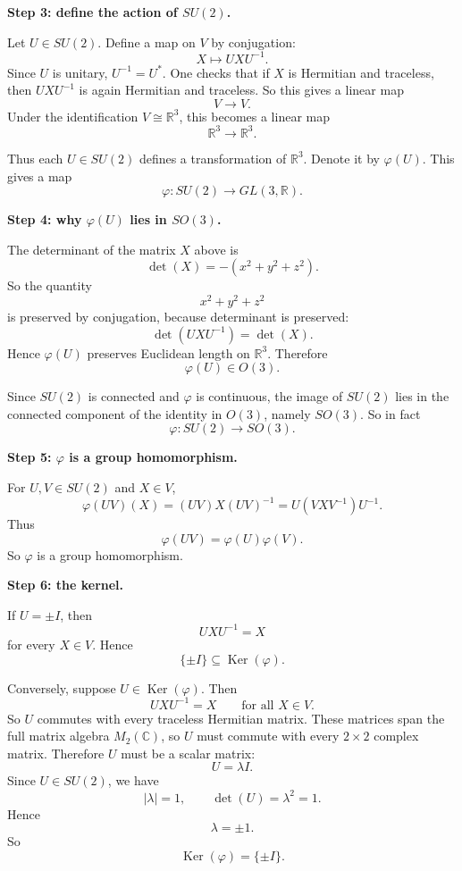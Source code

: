 \documentclass[12pt,a4paper]{article}
\theoremstyle{notespace}
\DeclareMathOperator{\Ker}{Ker}
\begin{document}
\medskip

\textbf{Step 3: define the action of \(SU(2)\).}

Let \(U\in SU(2)\). Define a map on \(V\) by conjugation:
\[
X\longmapsto UXU^{-1}.
\]
Since \(U\) is unitary, \(U^{-1}=U^*\). One checks that if \(X\) is Hermitian and traceless, then \(UXU^{-1}\) is again Hermitian and traceless. So this gives a linear map
\[
V\to V.
\]
Under the identification \(V\cong \mathbb R^3\), this becomes a linear map
\[
\mathbb R^3\to \mathbb R^3.
\]

Thus each \(U\in SU(2)\) defines a transformation of \(\mathbb R^3\). Denote it by \(\varphi(U)\). This gives a map
\[
\varphi:SU(2)\to GL(3,\mathbb R).
\]

\medskip

\textbf{Step 4: why \(\varphi(U)\) lies in \(SO(3)\).}

The determinant of the matrix \(X\) above is
\[
\det(X)=-(x^2+y^2+z^2).
\]
So the quantity
\[
x^2+y^2+z^2
\]
is preserved by conjugation, because determinant is preserved:
\[
\det(UXU^{-1})=\det(X).
\]
Hence \(\varphi(U)\) preserves Euclidean length on \(\mathbb R^3\). Therefore
\[
\varphi(U)\in O(3).
\]

Since \(SU(2)\) is connected and \(\varphi\) is continuous, the image of \(SU(2)\) lies in the connected component of the identity in \(O(3)\), namely \(SO(3)\). So in fact
\[
\varphi:SU(2)\to SO(3).
\]

\medskip

\textbf{Step 5: \(\varphi\) is a group homomorphism.}

For \(U,V\in SU(2)\) and \(X\in V\),
\[
\varphi(UV)(X)=(UV)X(UV)^{-1}=U(VXV^{-1})U^{-1}.
\]
Thus
\[
\varphi(UV)=\varphi(U)\varphi(V).
\]
So \(\varphi\) is a group homomorphism.

\medskip

\textbf{Step 6: the kernel.}

If \(U=\pm I\), then
\[
UXU^{-1}=X
\]
for every \(X\in V\). Hence
\[
\{\pm I\}\subseteq \Ker(\varphi).
\]

Conversely, suppose \(U\in \Ker(\varphi)\). Then
\[
UXU^{-1}=X
\qquad\text{for all }X\in V.
\]
So \(U\) commutes with every traceless Hermitian matrix. These matrices span the full matrix algebra \(M_2(\mathbb C)\), so \(U\) must commute with every \(2\times 2\) complex matrix. Therefore \(U\) must be a scalar matrix:
\[
U=\lambda I.
\]
Since \(U\in SU(2)\), we have
\[
|\lambda|=1,
\qquad
\det(U)=\lambda^2=1.
\]
Hence
\[
\lambda=\pm 1.
\]
So
\[
\Ker(\varphi)=\{\pm I\}.
\]
\end{document}
